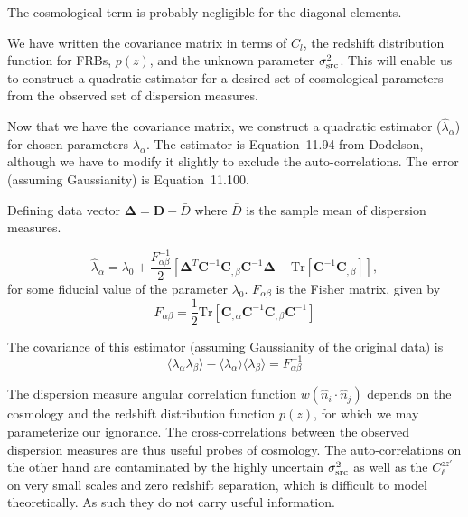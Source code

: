 \documentclass[onecolumn,prd,noshowpacs,nofootinbib,amsmath,amssymb]{revtex4}
\newcommand{\bD}{\boldsymbol D}
\newcommand{\bC}{\boldsymbol C}
\newcommand{\bDelta}{\boldsymbol \Delta}
\newcommand{\red}{}
\begin{document}
\red{The cosmological term is probably negligible for the diagonal elements.}

We have written the covariance matrix in terms of $C_l$, the
redshift distribution function for FRBs, $p(z)$, and the unknown parameter
$\sigma^2_{\rm src}$.  This will enable us to construct a quadratic estimator
for a desired set of cosmological parameters from the observed set of
dispersion measures.

Now that we have the covariance matrix, we construct a quadratic estimator
($\hat{\lambda}_\alpha$) for
chosen parameters $\lambda_\alpha$. The estimator is Equation~11.94 from
Dodelson, although we have to modify it slightly to exclude the
auto-correlations.  The error (assuming Gaussianity) is Equation~11.100.

Defining data vector $\bDelta = \bD - \bar{D}$ where $\bar{D}$ is the sample
mean of dispersion measures.

\begin{equation}
    \label{e:est_dod}
    \hat{\lambda}_\alpha = \lambda_0
        + \frac{F^{-1}_{\alpha\beta}}{2} 
        \left[ \bDelta^T \bC^{-1} \bC_{,\beta} \bC^{-1} \bDelta
        - \mathrm{Tr}\left[\bC^{-1} \bC_{,\beta}\right] \right],
\end{equation}
for some fiducial value of the parameter $\lambda_0$.  $F_{\alpha\beta}$ is the
Fisher matrix, given by
\begin{equation}
    F_{\alpha \beta} = \frac{1}{2} \mathrm{Tr} 
        \left[ \bC_{,\alpha} \bC^{-1} \bC_{,\beta} \bC^{-1} \right]
\end{equation}

The covariance of this estimator (assuming Gaussianity of the original
data) is
\begin{equation}
    \langle \lambda_\alpha \lambda_\beta \rangle
        - \langle \lambda_\alpha \rangle \langle \lambda_\beta \rangle
        = F^{-1}_{\alpha\beta}
\end{equation}

The dispersion measure angular correlation function 
$w(\hat{n}_i\cdot\hat{n}_j)$ depends on the cosmology
and the redshift distribution function $p(z)$, for which we may parameterize
our ignorance. The
cross-correlations between the observed dispersion measures are thus useful
probes of cosmology.  The auto-correlations on the other hand are contaminated
by the highly uncertain $\sigma^2_{\rm src}$ as well as the $C^{zz'}_\ell$ on
very small scales and zero redshift separation, which is difficult to model
theoretically.  As such they do not carry useful information.
\end{document}

